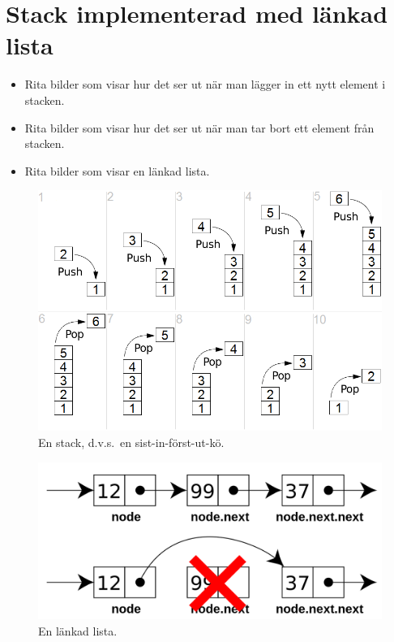 \section[Stack, länkad lista]{Stack implementerad med länkad lista}

\begin{frame}
  \begin{exercise}[Stack]
    \begin{itemize}
      \item Rita bilder som visar hur det ser ut när man lägger in ett nytt 
        element i stacken.
      \item Rita bilder som visar hur det ser ut när man tar bort ett element 
        från stacken.
      \item Rita bilder som visar en länkad lista.
    \end{itemize}
  \end{exercise}
\end{frame}

\begin{frame}
  \begin{figure}
    \includegraphics[height=0.8\textheight]{fig/lifo-stack.png}
    \caption{En stack, d.v.s.\ en sist-in-först-ut-kö.}
  \end{figure}
\end{frame}

\begin{frame}
  \begin{figure}
    \includegraphics[width=\columnwidth]{fig/linked-list.png}
    \caption{En länkad lista.}
  \end{figure}
\end{frame}


